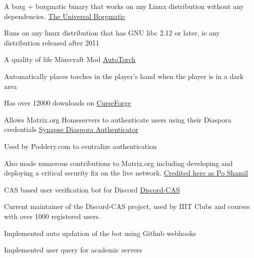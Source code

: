
\begin{cventries}
  \cventry
    {A borg + borgmatic binary that works on any Linux distribution without any dependencies.} %
    {\href{https://github.com/necessary129/the-universal-borgmatic}{The Universal Borgmatic}} %
    {} %
    {} %
    {
      \begin{cvitems} %
		\item {Runs on any linux distribution that has GNU libc 2.12 or later, ie any distribution released after 2011}
      \end{cvitems}
    }
	
	\cventry
    {A quality of life Minecraft Mod} %
    {\href{https://www.curseforge.com/minecraft/mc-mods/auto-torch}{AutoTorch}} %
    {} %
    {} %
    {
      \begin{cvitems} %
        \item {Automatically places torches in the player's hand when the player is in a dark area}
        \item {Has over 12000 downloads on \href{https://www.curseforge.com/minecraft/mc-mods/auto-torch}{CurseForge}}
	\end{cvitems}
    }
	
	\cventry
	{Allows Matrix.org Homeservers to authenticate users using their Diaspora credentials} %
	{\href{https://matrix.org/docs/projects/other/synapse-diaspora-auth}{Synapse Diaspora Authenticator}} %
	{} %
	{} %
	{
	  \begin{cvitems} %
		\item {Used by Poddery.com to centralize authentication}
		\item {Also made numerous contributions to Matrix.org including developing and deploying a critical security fix on the live network. \href{https://matrix.org/blog/2018/05/01/security-update-synapse-0-28-1/}{Credited here as Po Shamil}}
	  \end{cvitems}
	}

	\cventry
    {CAS based user verification bot for Discord} %
    {\href{https://github.com/Opensource-IIITH/Discord-CAS}{Discord-CAS}} %
    {} %
    {} %
    {
      \begin{cvitems} %
      	\item {Current maintainer of the Discord-CAS project, used by IIIT Clubs and courses with over 1000 registered users.}
		\item {Implemented auto updation of the bot using Github webhooks}
		\item {Implemented user query for academic servers}
      \end{cvitems}
    }


\end{cventries}
